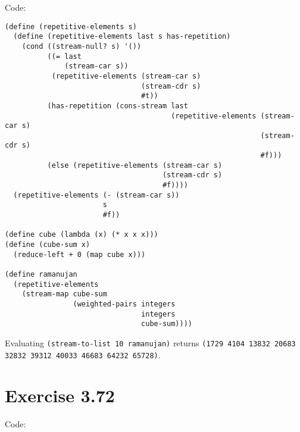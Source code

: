 \documentclass[../main.tex]{subfiles}
\begin{document}
Code:

\begin{lstlisting}
(define (repetitive-elements s)
  (define (repetitive-elements last s has-repetition)
    (cond ((stream-null? s) '())
          ((= last
              (stream-car s))
           (repetitive-elements (stream-car s)
                                (stream-cdr s)
                                #t))
          (has-repetition (cons-stream last
                                       (repetitive-elements (stream-car s)
                                                            (stream-cdr s)
                                                            #f)))
          (else (repetitive-elements (stream-car s)
                                     (stream-cdr s)
                                     #f))))
  (repetitive-elements (- (stream-car s))
                       s
                       #f))

(define cube (lambda (x) (* x x x)))
(define (cube-sum x)
  (reduce-left + 0 (map cube x)))

(define ramanujan
  (repetitive-elements
    (stream-map cube-sum
                (weighted-pairs integers
                                integers
                                cube-sum))))
\end{lstlisting}

Evaluating \lstinline{(stream-to-list 10 ramanujan)} returns \lstinline{(1729 4104 13832 20683 32832 39312 40033 46683 64232 65728)}.

\section{Exercise 3.72}

Code:
\end{document}
